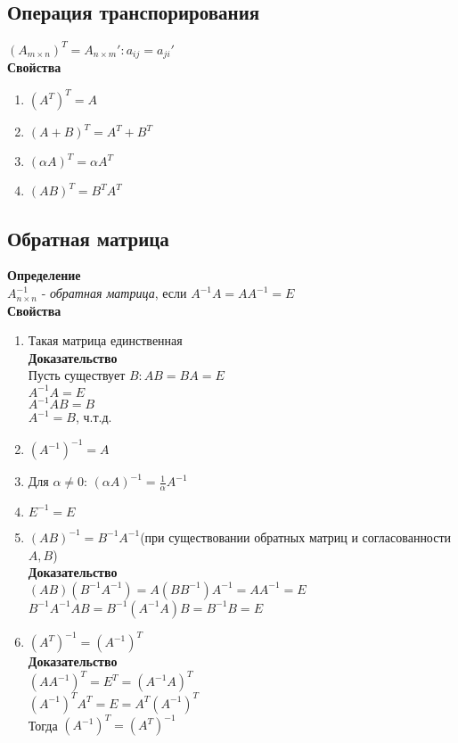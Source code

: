 \documentclass[12pt]{article}
\begin{document}
\subsection{Операция транспорирования}
$(A_{m\times n})^T = A_{n\times m}': a_{ij} = a_{ji}'$\\
\textbf{Свойства}
\begin{enumerate}
    \item $(A^T)^T = A$
    \item $(A+B)^T = A^T+B^T$
    \item $(\alpha A)^T = \alpha A^T$
    \item $(AB)^T = B^TA^T$
\end{enumerate}
\subsection{Обратная матрица}
\textbf{Определение}\\
$A^{-1}_{n\times n}$ - \textit{обратная матрица}, если $A^{-1}A=AA^{-1} = E$\\
\textbf{Свойства}
\begin{enumerate}
    \item Такая матрица единственная\\
    \textbf{Доказательство}\\
    Пусть существует $B: AB=BA=E$\\
    $A^{-1}A=E$\\
    $A^{-1}AB = B$\\
    $A^{-1} = B$, ч.т.д.
    \item $(A^{-1})^{-1} = A$
    \item Для $\alpha \neq 0$: $(\alpha A)^{-1} = \frac1\alpha A^{-1}$
    \item $E^{-1} = E$
    \item $(AB)^{-1} = B^{-1}A^{-1}$(при существовании обратных матриц и согласованности $A,B$)\\
    \textbf{Доказательство}\\
    $(AB)(B^{-1}A^{-1}) = A(BB^{-1})A^{-1}=AA^{-1} = E$\\
    $B^{-1}A^{-1}AB = B^{-1}(A^{-1}A)B = B^{-1}B = E$
    \item $(A^T)^{-1} = (A^{-1})^T$\\
    \textbf{Доказательство}\\
    $(AA^{-1})^T = E^T = (A^{-1}A)^T$\\
    $(A^{-1})^TA^T = E = A^T(A^{-1})^T$\\
    Тогда $(A^{-1})^T=(A^T)^{-1}$
\end{enumerate}
\end{document}

